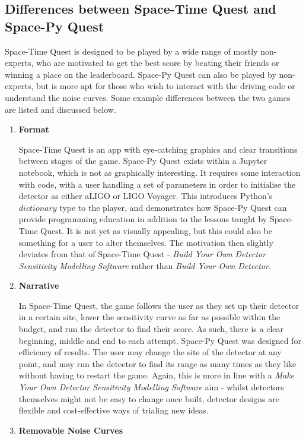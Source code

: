 \documentclass{article}
\begin{document}
\subsection{Differences between Space-Time Quest and Space-Py Quest}
\label{sec::differences}
Space-Time Quest is designed to be played by a wide range of mostly non-experts, who are motivated to get the best score by beating their friends or winning a place on the leaderboard. Space-Py Quest can also be played by non-experts, but is more apt for those who wish to interact with the driving code or understand the noise curves. Some example differences between the two games are listed and discussed below.
\par
\begin{enumerate}
    \item \textbf{Format} \par
    Space-Time Quest is an app with eye-catching graphics and clear transitions between stages of the game. Space-Py Quest exists within a Jupyter notebook, which is not as graphically interesting. It requires some interaction with code, with a user handling a set of parameters in order to initialise the detector as either aLIGO or LIGO Voyager. This introduces Python's $dictionary$ type to the player, and demonstrates how Space-Py Quest can provide programming education in addition to the lessons taught by Space-Time Quest. It is not yet as visually appealing, but this could also be something for a user to alter themselves. The motivation then slightly deviates from that of Space-Time Quest - \textit{Build Your Own Detector Sensitivity Modelling Software} rather than \textit{Build Your Own Detector}.
    \item \textbf{Narrative} \par
    In Space-Time Quest, the game follows the user as they set up their detector in a certain site, lower the sensitivity curve as far as possible within the budget, and run the detector to find their score. As such, there is a clear beginning, middle and end to each attempt. Space-Py Quest was designed for efficiency of results. The user may change the site of the detector at any point, and may run the detector to find its range as many times as they like without having to restart the game. Again, this is more in line with a \textit{Make Your Own Detector Sensitivity Modelling Software} aim - whilst detectors themselves might not be easy to change once built, detector designs are flexible and cost-effective ways of trialing new ideas.
    \item \textbf{Removable Noise Curves} \par

\end{enumerate}
\end{document}

